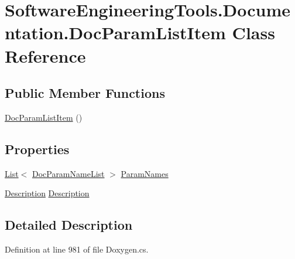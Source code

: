 \hypertarget{class_software_engineering_tools_1_1_documentation_1_1_doc_param_list_item}{\section{Software\+Engineering\+Tools.\+Documentation.\+Doc\+Param\+List\+Item Class Reference}
\label{class_software_engineering_tools_1_1_documentation_1_1_doc_param_list_item}
}
\subsection*{Public Member Functions}
\begin{DoxyCompactItemize}
\item 
\hyperlink{class_software_engineering_tools_1_1_documentation_1_1_doc_param_list_item_a1c659976c8f26af3b73450a4a8a36997}{Doc\+Param\+List\+Item} ()
\end{DoxyCompactItemize}
\subsection*{Properties}
\begin{DoxyCompactItemize}
\item 
\hyperlink{namespace_software_engineering_tools_1_1_documentation_ae0bccf4f49a76db084c1c316e5954ec9a4ee29ca12c7d126654bd0e5275de6135}{List}$<$ \hyperlink{class_software_engineering_tools_1_1_documentation_1_1_doc_param_name_list}{Doc\+Param\+Name\+List} $>$ \hyperlink{class_software_engineering_tools_1_1_documentation_1_1_doc_param_list_item_ad01ae5f9eec5ea62d109669011cd1057}{Param\+Names}
\item 
\hyperlink{class_software_engineering_tools_1_1_documentation_1_1_description}{Description} \hyperlink{class_software_engineering_tools_1_1_documentation_1_1_doc_param_list_item_a3a9c87ee0dd403127be13ef7b8d6579a}{Description}
\end{DoxyCompactItemize}


\subsection{Detailed Description}


Definition at line 981 of file Doxygen.\+cs.



